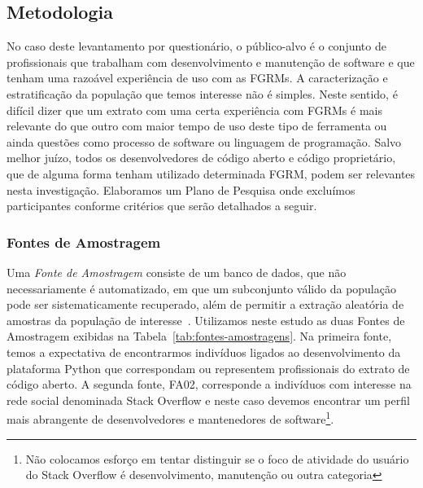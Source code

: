 \subsection{Metodologia}
\label{subsec:pesq_metodologias}

No caso deste levantamento por questionário, o público-alvo é o conjunto de
profissionais que trabalham com desenvolvimento e manutenção de software e que
tenham uma razoável experiência de uso com as FGRMs. A caracterização e
estratificação da população que temos interesse não é simples. Neste sentido, é
difícil dizer que um extrato com uma certa experiência com FGRMs é mais
relevante do que outro com maior tempo de uso deste tipo de ferramenta ou ainda
questões como processo de software ou linguagem de programação. Salvo melhor
juízo, todos os desenvolvedores de código aberto e código proprietário, que de
alguma forma tenham utilizado determinada FGRM, podem ser relevantes nesta
investigação. Elaboramos um Plano de Pesquisa onde excluímos participantes
conforme critérios que serão detalhados a seguir.

\subsubsection{Fontes de Amostragem}
\label{subsubsec:fontes_amostragem}

Uma \textit{Fonte de Amostragem} consiste de um banco de dados, que não
necessariamente é automatizado, em que um subconjunto válido da população pode
ser sistematicamente recuperado, além de permitir a extração aleatória de
amostras da população de interesse~\cite{de2014towards}. Utilizamos neste estudo
as duas Fontes de Amostragem exibidas na Tabela~\ref{tab:fontes-amostragens}.
Na primeira fonte, temos a expectativa de encontrarmos indivíduos ligados ao
desenvolvimento da plataforma Python que correspondam ou representem
profissionais do extrato de código aberto. A segunda fonte, FA02, corresponde a
indivíduos com interesse na rede social denominada Stack Overflow e neste caso
devemos encontrar um perfil mais abrangente de desenvolvedores e mantenedores de
software\footnote{Não colocamos esforço em tentar distinguir se o foco de
    atividade do usuário do Stack Overflow é desenvolvimento, manutenção ou
    outra categoria}.

\begin{table}[htpb]
\centering
{}
\caption{Fontes de Amostragem utilizadas no levantamento com questionário.}
\label{tab:fontes-amostragens}
\end{table}

